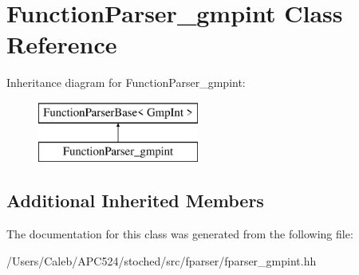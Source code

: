 \hypertarget{class_function_parser__gmpint}{}\section{Function\+Parser\+\_\+gmpint Class Reference}
\label{class_function_parser__gmpint}
Inheritance diagram for Function\+Parser\+\_\+gmpint\+:\begin{figure}[H]
\begin{center}
\leavevmode
\includegraphics[height=2.000000cm]{class_function_parser__gmpint}
\end{center}
\end{figure}
\subsection*{Additional Inherited Members}


The documentation for this class was generated from the following file\+:\begin{DoxyCompactItemize}
\item 
/\+Users/\+Caleb/\+A\+P\+C524/stoched/src/fparser/fparser\+\_\+gmpint.\+hh\end{DoxyCompactItemize}
